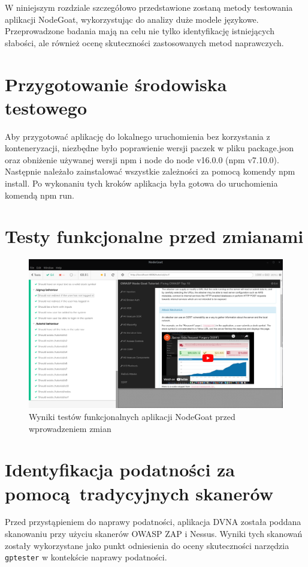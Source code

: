 W niniejszym rozdziale szczegółowo przedstawione zostaną metody testowania aplikacji NodeGoat, wykorzystując do analizy duże modele językowe. Przeprowadzone badania mają na celu nie tylko identyfikację istniejących słabości, ale również ocenę skuteczności zastosowanych metod naprawczych.

\section{Przygotowanie środowiska testowego}
\label{sec:przygotowanie_srodowiska_testowego}

Aby przygotować aplikację do lokalnego uruchomienia bez korzystania z konteneryzacji, niezbędne było poprawienie wersji paczek w pliku package.json oraz obniżenie używanej wersji npm i node do node v16.0.0 (npm v7.10.0). Następnie należało zainstalować wszystkie zależności za pomocą komendy npm install. Po wykonaniu tych kroków aplikacja była gotowa do uruchomienia komendą npm run.

\section{Testy funkcjonalne przed zmianami}
\label{sec:testy_funkcjonalne_przed_zmianami}

\begin{figure}[H]
  \centering
  \includegraphics[width=\linewidth]{img/func-test-goat-before.png}
  \caption{Wyniki testów funkcjonalnych aplikacji NodeGoat przed wprowadzeniem zmian}
  \label{fig:nodegoat-before}
\end{figure}

\section{Identyfikacja podatności za pomocą tradycyjnych skanerów}
Przed przystąpieniem do naprawy podatności, aplikacja DVNA została poddana skanowaniu przy użyciu skanerów OWASP ZAP i Nessus. Wyniki tych skanowań zostały wykorzystane jako punkt odniesienia do oceny skuteczności narzędzia \texttt{gptester} w kontekście naprawy podatności.


